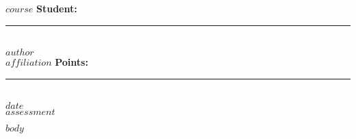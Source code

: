 \documentclass[letterpaper,10pt,twoside]{article}
\begin{document}
\thispagestyle{empty}


\begin{flushleft}
\titlefont\normalsize{$course$} \hfill{\rmfamily\bfseries{Student: }}\rule{2cm}{0.4pt}\\ 
\vspace{.2cm}
\rmfamily\footnotesize{$author$}\\
\rmfamily\footnotesize{$affiliation$} \hfill{\normalsize\rmfamily\bfseries{Points: }}\rule{2cm}{0.4pt}\\ 
\rmfamily\footnotesize{$date$} \\
\vspace{.6cm}
\titlefont\Large{$assessment$} 
\end{flushleft}
\vspace{.2cm}

\setlength{\columnsep}{5em}
\begin{multicols}{2}
$body$
\end{multicols}
\end{document}
